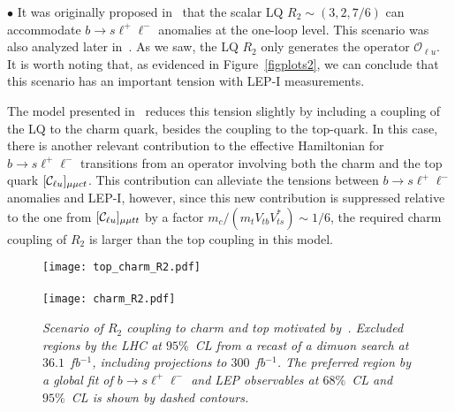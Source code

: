 \documentclass[aps,twocolumn,showpacs,preprintnumbers,amsmath,amssymb,floatfix,nofootinbib]{revtex4-1}
\newcommand{\C}{{\cal C}}
\begin{document}
$\bullet$ It was originally proposed in~\cite{Becirevic:2017jtw} that the scalar LQ $R_2 \sim (3,2,7/6)$ can accommodate $b \to s \ell^+ \ell^-$ anomalies at the one-loop level.      This scenario was also analyzed later in~\cite{Fajfer:2018bfj}.  As we saw,  the LQ $R_2$ only generates the operator $\mathcal{O}_{\ell u}$.    It is worth noting that, as evidenced in Figure~\ref{figplots2}, we can conclude that this scenario has an important tension with LEP-I measurements.    

The model presented in~\cite{Becirevic:2017jtw} reduces this tension slightly by including a coupling of the LQ to the charm quark, besides the coupling to the top-quark.   In this case, there is another relevant contribution to the effective Hamiltonian for $b \to s \ell^+ \ell^-$ transitions from an operator involving both the charm and the top quark $[\C_{\ell u}]_{\mu \mu ct}$.   This contribution can alleviate the tensions between $b \to s \ell^+ \ell^-$ anomalies and LEP-I, however, since this new contribution is suppressed relative to the one from $[\C_{\ell u}]_{\mu \mu tt}$ by a factor $m_c/(m_t V_{tb}  V_{ts}^*)  \sim 1/6$, the required charm coupling of $R_2$ is larger than the top coupling in this model. 

%
\begin{figure}[t]
\begin{center}{
\texttt{[image: top\_charm\_R2.pdf]}\\
\ \\
\texttt{[image: charm\_R2.pdf]} \\
\caption{\textit{Scenario of $R_2$ coupling to charm and top motivated by~\cite{Becirevic:2017jtw}.  Excluded regions by the LHC at $95\%$~CL from a recast of a dimuon search at $36.1$~fb$^{-1}$, including projections to $300$~fb$^{-1}$.   The preferred region by a global fit of $b \to s \ell^+ \ell^-$ and LEP observables at $68\%$~CL and $95\%$~CL is shown by dashed contours.}    \label{figlhcr2}     } }
\end{center}
\end{figure}
\end{document}
